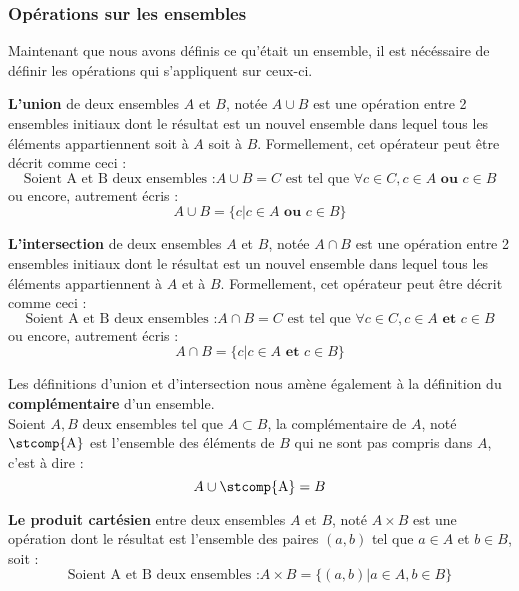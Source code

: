 \subsubsection{Opérations sur les ensembles}
Maintenant que nous avons définis ce qu'était un ensemble, il est nécéssaire de définir les opérations qui s'appliquent sur ceux-ci. 
\begin{mydef}
    \textbf{L'union} de deux ensembles $A$ et $B$, notée $A \cup B$ est une opération entre 2 ensembles initiaux dont le résultat est un nouvel ensemble dans lequel tous les éléments appartiennent soit à $A$ soit à $B$. Formellement, cet opérateur peut être décrit comme ceci :
    $$ \text{Soient A et B deux ensembles :} A \cup B = C \text{ est tel que } \forall c \in C, c \in A \textbf{ ou } c\in B  $$ ou encore, autrement écris :
    $$ A \cup B = \{ c | c \in A \textbf{ ou } c \in B \} $$
\end{mydef}
\begin{mydef}
    \textbf{L'intersection} de deux ensembles $A$ et $B$, notée $A \cap B$ est une opération entre 2 ensembles initiaux dont le résultat est un nouvel ensemble dans lequel tous les éléments appartiennent à $A$ et à $B$. Formellement, cet opérateur peut être décrit comme ceci :
    $$ \text{Soient A et B deux ensembles :} A \cap B = C \text{ est tel que } \forall c \in C, c \in A \textbf{ et } c\in B  $$ ou encore, autrement écris :
    $$ A \cap B = \{ c | c \in A \textbf{ et } c \in B \} $$ 
\end{mydef}
\begin{myrem}
  Les définitions d'union et d'intersection nous amène également à la définition du \textbf{complémentaire} d'un ensemble. \\
  Soient $A,B$ deux ensembles tel que $A \subset B$, la complémentaire de $A$, noté $\stcomp{\mathrm{A}}$ est l'ensemble des éléments de $B$ qui ne sont pas compris dans $A$, c'est à dire :
  $$ A \cup \stcomp{\mathrm{A}} = B$$
\end{myrem}
\begin{mydef}\label{def:produit_cartésien}
    \textbf{Le produit cartésien} entre deux ensembles $A$ et $B$, noté $A \times B$ est une opération dont le résultat est l'ensemble des paires $(a,b)$ tel que $a\in A$ et $b \in B$, soit :
    $$ \text{Soient A et B deux ensembles :} A \times B = \{(a,b)|a\in A , b\in B\} $$
\end{mydef}
